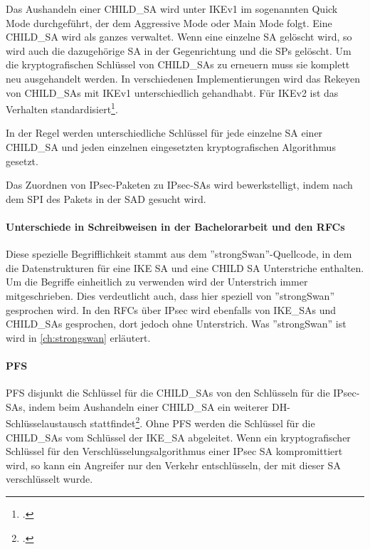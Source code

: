 Das Aushandeln einer CHILD\_SA wird unter IKEv1 im sogenannten Quick Mode durchgeführt, der dem Aggressive Mode
oder Main Mode folgt.
Eine CHILD\_SA wird als ganzes verwaltet. Wenn eine einzelne \ac{SA} gelöscht wird, so wird
auch die dazugehörige \ac{SA} in der Gegenrichtung und die \acp{SP} gelöscht.
Um die kryptografischen Schlüssel von CHILD\_SAs zu erneuern muss sie komplett neu ausgehandelt werden.
In verschiedenen Implementierungen wird das Rekeyen von CHILD\_SAs mit IKEv1 unterschiedlich gehandhabt.
Für IKEv2 ist das Verhalten standardisiert\footcite[][16]{charlie_kaufman_rfc_2014}.

In der Regel werden unterschiedliche Schlüssel für jede einzelne SA einer CHILD\_SA
und jeden einzelnen eingesetzten kryptografischen Algorithmus gesetzt.

Das Zuordnen von \ac{IPsec}-Paketen zu \ac{IPsec}-\acp{SA} wird bewerkstelligt,
indem nach dem \ac{SPI} des Pakets in der \ac{SAD} gesucht wird.

\paragraph{Unterschiede in Schreibweisen in der Bachelorarbeit und den RFCs}
Diese spezielle Begrifflichkeit stammt aus dem ''strongSwan''-Quellcode, in dem
die Datenstrukturen für eine IKE SA und eine CHILD SA Unterstriche enthalten.
Um die Begriffe einheitlich zu verwenden wird der Unterstrich immer mitgeschrieben.
Dies verdeutlicht auch, dass hier speziell von ''strongSwan'' gesprochen wird.
In den \acp{RFC} über \ac{IPsec} wird ebenfalls von IKE\_SAs und CHILD\_SAs gesprochen,
dort jedoch ohne Unterstrich. Was ''strongSwan'' ist wird in \autoref{ch:strongswan} erläutert.

\paragraph{PFS}
\ac{PFS} disjunkt die Schlüssel für die CHILD\_SAs von den Schlüsseln
für die \ac{IPsec}-\acp{SA}, indem beim Aushandeln einer CHILD\_SA ein weiterer
\ac{DH}-Schlüsselaustausch stattfindet\footcite[13]{charlie_kaufman_rfc_2014}.
Ohne \ac{PFS} werden die Schlüssel für die CHILD\_SAs vom Schlüssel der IKE\_SA
abgeleitet. Wenn ein kryptografischer Schlüssel für den Verschlüsselungsalgorithmus
einer \ac{IPsec} \ac{SA} kompromittiert wird, so kann ein Angreifer nur den Verkehr entschlüsseln,
der mit dieser \ac{SA} verschlüsselt wurde.

